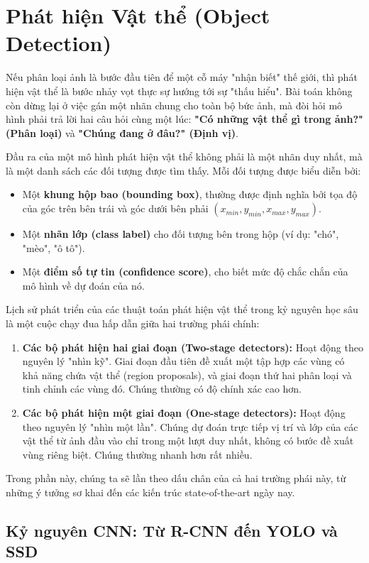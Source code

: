 \section{Phát hiện Vật thể (Object Detection)}
\label{sec:object_detection}

Nếu phân loại ảnh là bước đầu tiên để một cỗ máy "nhận biết" thế giới, thì phát hiện vật thể là bước nhảy vọt thực sự hướng tới sự "thấu hiểu". Bài toán không còn dừng lại ở việc gán một nhãn chung cho toàn bộ bức ảnh, mà đòi hỏi mô hình phải trả lời hai câu hỏi cùng một lúc: \textbf{"Có những vật thể gì trong ảnh?" (Phân loại)} và \textbf{"Chúng đang ở đâu?" (Định vị)}.

Đầu ra của một mô hình phát hiện vật thể không phải là một nhãn duy nhất, mà là một danh sách các đối tượng được tìm thấy. Mỗi đối tượng được biểu diễn bởi:
\begin{itemize}
	\item Một \textbf{khung hộp bao (bounding box)}, thường được định nghĩa bởi tọa độ của góc trên bên trái và góc dưới bên phải $(x_{min}, y_{min}, x_{max}, y_{max})$.
	\item Một \textbf{nhãn lớp (class label)} cho đối tượng bên trong hộp (ví dụ: "chó", "mèo", "ô tô").
	\item Một \textbf{điểm số tự tin (confidence score)}, cho biết mức độ chắc chắn của mô hình về dự đoán của nó.
\end{itemize}

Lịch sử phát triển của các thuật toán phát hiện vật thể trong kỷ nguyên học sâu là một cuộc chạy đua hấp dẫn giữa hai trường phái chính:
\begin{enumerate}
	\item \textbf{Các bộ phát hiện hai giai đoạn (Two-stage detectors):} Hoạt động theo nguyên lý "nhìn kỹ". Giai đoạn đầu tiên đề xuất một tập hợp các vùng có khả năng chứa vật thể (region proposals), và giai đoạn thứ hai phân loại và tinh chỉnh các vùng đó. Chúng thường có độ chính xác cao hơn.
	\item \textbf{Các bộ phát hiện một giai đoạn (One-stage detectors):} Hoạt động theo nguyên lý "nhìn một lần". Chúng dự đoán trực tiếp vị trí và lớp của các vật thể từ ảnh đầu vào chỉ trong một lượt duy nhất, không có bước đề xuất vùng riêng biệt. Chúng thường nhanh hơn rất nhiều.
\end{enumerate}
Trong phần này, chúng ta sẽ lần theo dấu chân của cả hai trường phái này, từ những ý tưởng sơ khai đến các kiến trúc state-of-the-art ngày nay.

\subsection{Kỷ nguyên CNN: Từ R-CNN đến YOLO và SSD}
\label{subsec:cnn_based_detectors}


